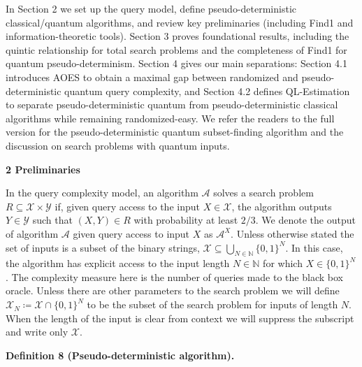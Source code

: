 In Section 2 we set up the query model, define pseudo-deterministic classical/quantum algorithms, and review key preliminaries (including Find1 and information-theoretic tools). Section 3 proves foundational results, including the quintic relationship for total search problems and the completeness of Find1 for quantum pseudo-determinism. Section 4 gives our main separations: Section 4.1 introduces AOES to obtain a maximal gap between randomized and pseudo-deterministic quantum query complexity, and Section 4.2 defines QL-Estimation to separate pseudo-deterministic quantum from pseudo-deterministic classical algorithms while remaining randomized-easy. We refer the readers to the full version for the pseudo-deterministic quantum subset-finding algorithm and the discussion on search problems with quantum inputs.\par






\par\medskip\noindent\textbf{
2 Preliminaries}\par




In the query complexity model, an algorithm $\mathcal{A}$ solves a search problem ${R}\subseteq\mathcal{X}\times\mathcal{Y}$ if, given query access to the input $X\in\mathcal{X}$, the algorithm outputs $Y\in\mathcal{Y}$ such that $(X,Y)\in{R}$ with probability at least $2/3$. We denote the output of algorithm $\mathcal{A}$ given query access to input $X$ as $\mathcal{A}^{X}$.
Unless otherwise stated the set of inputs is a subset of the binary strings, $\mathcal{X}\subseteq\bigcup_{N\in\mathbb{N}}\{0,1\}^{N}$. In this case, the algorithm has explicit access to the input length $N\in\mathbb{N}$ for which $X\in\{0,1\}^{N}$. The complexity measure here is the number of queries made to the black box oracle. Unless there are other parameters to the search problem we will define $\mathcal{X}_{N}\coloneqq\mathcal{X}\cap\{0,1\}^{N}$ to be the subset of the search problem for inputs of length $N$. When the length of the input is clear from context we will suppress the subscript and write only $\mathcal{X}$.\par





\par\medskip\noindent\textbf{
\textbf{Definition 8}\textbf{ }(Pseudo-deterministic algorithm)\textbf{.}
}\par



